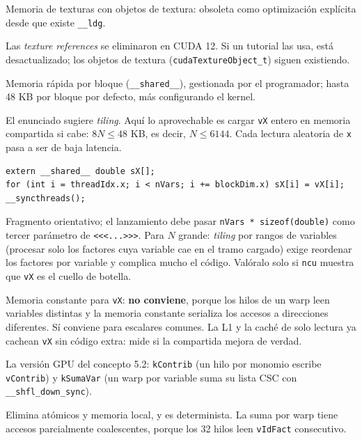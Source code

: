 \alt Memoria de texturas con objetos de textura: obsoleta como optimización explícita desde que existe \texttt{\_\_ldg}.

\begin{trampa}
Las \emph{texture references} se eliminaron en CUDA 12. Si un tutorial las usa, está desactualizado; los objetos de textura (\texttt{cudaTextureObject\_t}) siguen existiendo.
\end{trampa}

\que Memoria rápida por bloque (\texttt{\_\_shared\_\_}), gestionada por el programador; hasta 48 KB por bloque por defecto, más configurando el kernel.

\porque El enunciado sugiere \emph{tiling}. Aquí lo aprovechable es cargar \texttt{vX} entero en memoria compartida si cabe: $8N\le48$ KB, es decir, $N\le6144$. Cada lectura aleatoria de \texttt{x} pasa a ser de baja latencia.

\como
\begin{lstlisting}[language=CUDA]
extern __shared__ double sX[];
for (int i = threadIdx.x; i < nVars; i += blockDim.x) sX[i] = vX[i];
__syncthreads();
\end{lstlisting}
Fragmento orientativo; el lanzamiento debe pasar \texttt{nVars * sizeof(double)} como tercer parámetro de \texttt{<<<...>>>}. Para $N$ grande: \emph{tiling} por rangos de variables (procesar solo los factores cuya variable cae en el tramo cargado) exige reordenar los factores por variable y complica mucho el código. Valóralo solo si \texttt{ncu} muestra que \texttt{vX} es el cuello de botella.

\alt Memoria constante para \texttt{vX}: \textbf{no conviene}, porque los hilos de un warp leen variables distintas y la memoria constante serializa los accesos a direcciones diferentes. Sí conviene para escalares comunes. La L1 y la caché de solo lectura ya cachean \texttt{vX} sin código extra: mide si la compartida mejora de verdad.

\que La versión GPU del concepto 5.2: \texttt{kContrib} (un hilo por monomio escribe \texttt{vContrib}) y \texttt{kSumaVar} (un warp por variable suma su lista CSC con \texttt{\_\_shfl\_down\_sync}).

\porque Elimina atómicos y memoria local, y es determinista. La suma por warp tiene accesos parcialmente coalescentes, porque los 32 hilos leen \texttt{vIdFact} consecutivo.

